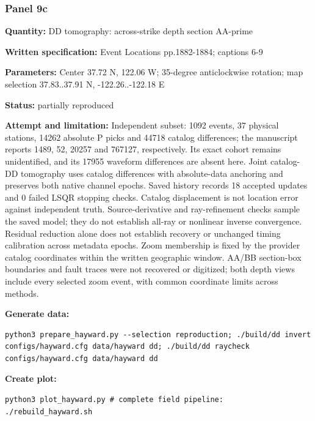 \subsubsection*{Panel 9c}
\noindent\textbf{Quantity:} DD tomography: across-strike depth section AA-prime\par
\noindent\textbf{Written specification:} Event Locations pp.1882-1884; captions 6-9\par
\noindent\textbf{Parameters:} Center 37.72 N, 122.06 W; 35-degree anticlockwise rotation; map selection 37.83..37.91 N, -122.26..-122.18 E\par
\noindent\textbf{Status:} partially reproduced\par
\noindent\textbf{Attempt and limitation:} Independent subset: 1092 events, 37 physical stations, 14262 absolute P picks and 44718 catalog differences; the manuscript reports 1489, 52, 20257 and 767127, respectively. Its exact cohort remains unidentified, and its 17955 waveform differences are absent here. Joint catalog-DD tomography uses catalog differences with absolute-data anchoring and preserves both native channel epochs. Saved history records 18 accepted updates and 0 failed LSQR stopping checks. Catalog displacement is not location error against independent truth. Source-derivative and ray-refinement checks sample the saved model; they do not establish all-ray or nonlinear inverse convergence. Residual reduction alone does not establish recovery or unchanged timing calibration across metadata epochs. Zoom membership is fixed by the provider catalog coordinates within the written geographic window. AA/BB section-box boundaries and fault traces were not recovered or digitized; both depth views include every selected zoom event, with common coordinate limits across methods.\par
\noindent\textbf{Generate data:}
\begin{lstlisting}
python3 prepare_hayward.py --selection reproduction; ./build/dd invert configs/hayward.cfg data/hayward dd; ./build/dd raycheck configs/hayward.cfg data/hayward dd
\end{lstlisting}
\noindent\textbf{Create plot:}
\begin{lstlisting}
python3 plot_hayward.py # complete field pipeline: ./rebuild_hayward.sh
\end{lstlisting}
